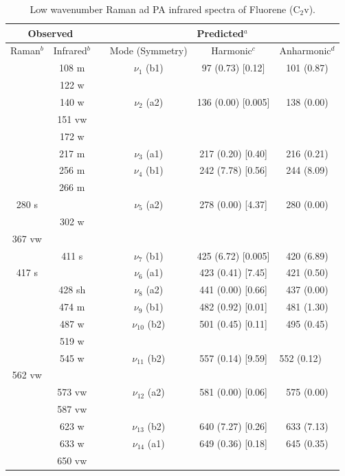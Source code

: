 \begin{table}[H]
	\caption{Low wavenumber Raman ad PA infrared spectra of Fluorene (C$_{2}$v).}
	\begin{center}
			\begin{tabular}{c c c c c c}
				\hline
				\multicolumn{ 2}{c}{Observed} & \multicolumn{1}{c}{} & \multicolumn{ 3}{c}{Predicted$^{a}$} \\ \hline
				Raman$^{b}$ & \multicolumn{1}{c}{Infrared$^{b}$} &  & \multicolumn{1}{c}{Mode (Symmetry)} & \multicolumn{1}{c}{Harmonic$^{c}$} & Anharmonic$^{d}$ \\ \hline
 & 108 m &  &$\nu_{1}$ (b1) & 97 (0.73) [0.12] & 101 (0.87) \\ 
 & 122 w &  &  &  &  \\ 
 & 140 w &  &$\nu_{2}$ (a2) & 136 (0.00) [0.005] & 138 (0.00) \\ 
 & 151 vw &  &  &  &  \\ 
 & 172 w &  &  &  &  \\ 
 & 217 m &  & $\nu_{3}$ (a1) & 217 (0.20) [0.40] & 216 (0.21) \\ 
 & 256 m &  & $\nu_{4}$ (b1) & 242 (7.78) [0.56] & 244 (8.09) \\ 
 & 266 m &  &  &  &  \\ 
 280 s &  &  & $\nu_{5}$ (a2) & 278 (0.00) [4.37] & 280 (0.00) \\ 
 & 302 w &  &  &  &  \\ 
 367 vw &  &  &  &  &  \\ 
 & 411 s &  & $\nu_{7}$ (b1) & 425 (6.72) [0.005] & 420 (6.89)  \\ 
 417 s &  &  & $\nu_{6}$ (a1) & 423 (0.41) [7.45] & 421 (0.50) \\ 
 & 428 sh &  & $\nu_{8}$ (a2) & 441 (0.00) [0.66] & 437 (0.00) \\ 
 & 474 m &  & $\nu_{9}$ (b1) & 482 (0.92) [0.01] & 481 (1.30) \\ 
 & 487 w &  & $\nu_{10}$ (b2) & 501 (0.45) [0.11] & 495 (0.45) \\ 
  & 519 w &  & \multicolumn{1}{c}{} &  &  \\ 
  & 545 w &  & $\nu_{11}$ (b2) & 557 (0.14) [9.59] & \multicolumn{1}{l}{552 (0.12)} \\ 
  562 vw &  &  &  &  &  \\ 
  & 573 vw &  & $\nu_{12}$ (a2) & 581 (0.00) [0.06] & 575 (0.00) \\ 
  & 587 vw &  &  &  &  \\ 
   & 623 w &  & $\nu_{13}$ (b2) & 640 (7.27) [0.26] & 633 (7.13) \\ 
   & 633 w &  & $\nu_{14}$ (a1)  & 649 (0.36) [0.18] & 645 (0.35) \\ 
   & 650 vw &  &  &  &  \\
 \bottomrule
\end{tabular}
\end{center}
\end{table}
 
